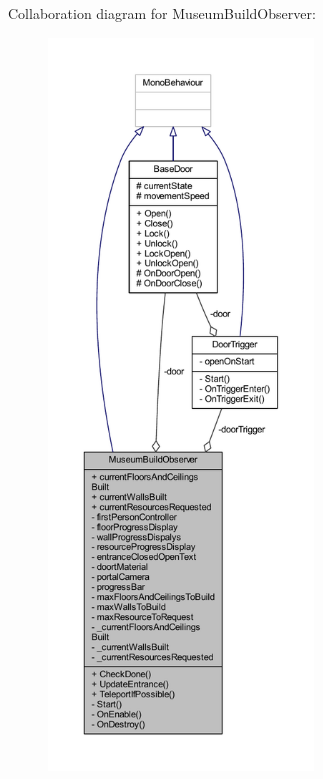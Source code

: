 Collaboration diagram for Museum\+Build\+Observer\+:
\nopagebreak
\begin{figure}[H]
\begin{center}
\leavevmode
\includegraphics[height=550pt]{class_museum_build_observer__coll__graph}
\end{center}
\end{figure}
